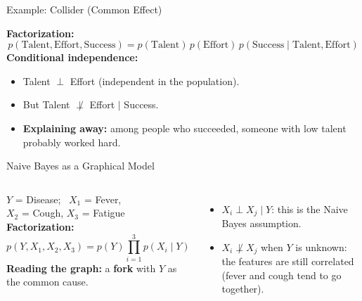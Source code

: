 \documentclass[aspectratio=169]{beamer}
\begin{document}
\begin{frame}{Example: Collider (Common Effect)}
\centering
{}

\vspace{0.2cm}
\raggedright
\textbf{Factorization:}
\[
  p(\text{Talent}, \text{Effort}, \text{Success}) = p(\text{Talent})\, p(\text{Effort})\, p(\text{Success}\mid\text{Talent}, \text{Effort})
\]
\textbf{Conditional independence:}
\begin{itemize}
  \item Talent $\perp$ Effort (independent in the population).
  \item But Talent $\not\perp$ Effort $\mid$ Success.
  \item \textbf{Explaining away:} among people who succeeded, someone with low talent probably worked hard.
\end{itemize}
\end{frame}

\begin{frame}{Naive Bayes as a Graphical Model}
\begin{columns}[c]
\centering
{}

\vspace{0.2cm}
{\small $Y$ = Disease; \ $X_1$ = Fever,\\ $X_2$ = Cough, $X_3$ = Fatigue}
\textbf{Factorization:}
\[
  p(Y, X_1, X_2, X_3) = p(Y)\prod_{i=1}^{3} p(X_i\mid Y)
\]
\textbf{Reading the graph:} a \textbf{fork} with $Y$ as the common cause.
\begin{itemize}
  \item $X_i \perp X_j \mid Y$: this is the Naive Bayes assumption.
  \item $X_i \not\perp X_j$ when $Y$ is unknown: the features are still correlated (fever and cough tend to go together).
\end{itemize}
\end{columns}
\end{frame}
\end{document}
